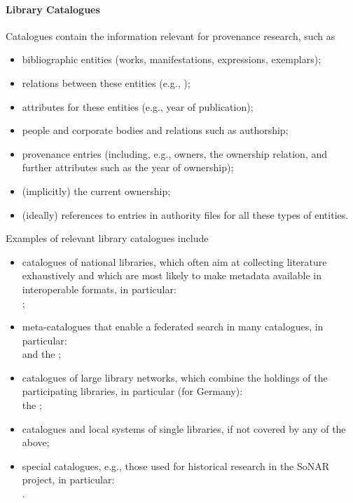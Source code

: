 \paragraph{Library Catalogues}
%
Catalogues contain the information relevant for provenance research, such as
%
\begin{itemize}
  \item
    bibliographic entities (works, manifestations, expressions, exemplars);
  \item
    relations between these entities (e.g., );
  \item
    attributes for these entities (e.g., year of publication);
  \item
    people and corporate bodies and relations such as authorship;
  \item
    provenance entries (including, e.g., owners, the ownership relation, and further attributes such as the year of ownership);
  \item
    (implicitly) the current ownership;
  \item
    (ideally) references to entries in authority files for all these types of entities.
\end{itemize}
%
Examples of relevant library catalogues include
%
\begin{itemize}
  \item
    catalogues of national libraries, which often aim at collecting literature exhaustively
    and which are most likely to make metadata available in interoperable formats,
    in particular: \\
     \autocite{DNBCatalogue,LoCcatalogue,BLcatalogue};
  \item
    meta-catalogues that enable a federated search in many catalogues,
    in particular: \\
     and the  \autocite{WorldCat,KVK};
  \item
    catalogues of large library networks, which combine the holdings of the participating libraries,
    in particular (for Germany): \\
    the  \autocite{K10plus,B3KAT,hbz,hebis};
  \item
    catalogues and local systems of single libraries, if not covered by any of the above;
  \item
    special catalogues, e.g., those used for historical research in the \gls{SoNAR} project, %
    in particular: \\
     \autocite{ZDB,KPE,ZEFYS,ExilePress}.
\end{itemize}

